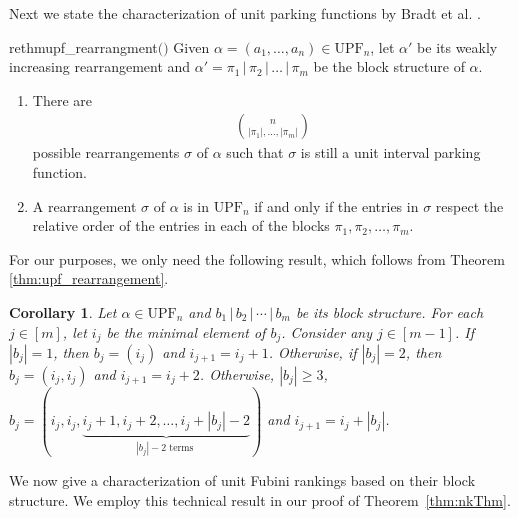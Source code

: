 \documentclass[11pt,reqno]{amsart}
\newcommand{\upf}[1]{\mathrm{UPF}_{#1}}
\newtheorem{corollary}[rethm]{Corollary}
\begin{document}
Next we state the characterization of unit parking functions by Bradt et al. \cite[Theorem 2.9]{bradt2024unit}.

\begin{restatable}{rethm}{upf_rearrangment}$($\cite{bradt2024unit}$)$\label{thm:upf_rearrangement}
Given $\alpha = (a_1, \ldots, a_n) \in \upf{n}$, let $\alpha'$ be its weakly increasing rearrangement and $\alpha'=\pi_1\,|\,\pi_2\,|\,\dots\,|\,\pi_m$ be the block structure of $\alpha$.
\begin{enumerate}
    \item  There are
\begin{align}
\binom{n}{|\pi_1|,\ldots, |\pi_m|}   \label{eq:rearrange count}
\end{align}
possible rearrangements $\sigma$ of $\alpha$ such that $\sigma$ is still a unit interval parking function.
\item A rearrangement $\sigma$ of $\alpha$ is in $\upf{n}$ if and only if the entries in $\sigma$ respect the relative order of the entries in each of the blocks $\pi_1,\pi_2,\ldots,\pi_m$.
\end{enumerate}
\end{restatable}

For our purposes, we only need the following result, which follows from Theorem \ref{thm:upf_rearrangement}. 

\begin{corollary}
\label{cor: block internals}
Let $\alpha \in \upf{n}$ and $b_1\,|\,b_2\,|\,\cdots\,|\,b_m$ be its block structure.
For each $j \in [m]$, let $i_j$ be the minimal element of $b_j$.
Consider any $j \in [m - 1]$.
If $|b_j| = 1$, then $b_j = (i_j)$ and $i_{j+1} = i_j + 1$.
Otherwise, if $|b_j| = 2$, then $b_j = (i_j, i_j)$ and $i_{j+1} = i_j + 2$.
Otherwise, $|b_j| \geq 3$, $b_j = (i_j, i_j, \underbrace{i_j + 1, i_j + 2, \ldots, i_j + |b_j| - 2}_{|b_j| - 2 \text{ terms }})$ and $i_{j+1} = i_j + |b_j|$.
\end{corollary}


We now give a characterization of unit Fubini rankings based on their block structure.
We employ this technical result in our proof of Theorem~\ref{thm:nkThm}.
\end{document}
